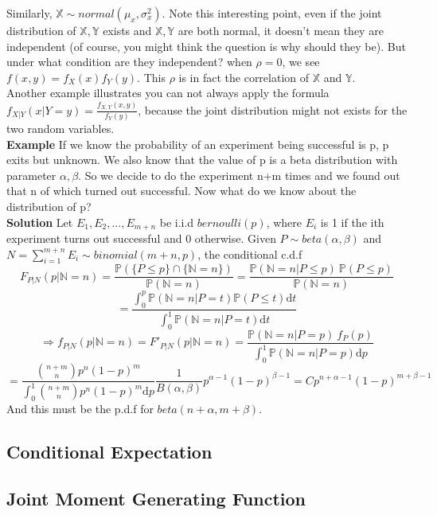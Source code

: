 \documentclass[a4paper,12pt]{article}
\begin{document}
Similarly, $\mathbb{X} \sim  normal( \mu_x, \sigma^2_x)$. Note this interesting point, even if the joint distribution of $\mathbb{X}, \mathbb{Y}$ exists and $\mathbb{X}, \mathbb{Y}$ are both normal, it doesn't mean they are independent (of course, you might think the question is why should they be). But under what condition are they independent? when $\rho = 0$, we see $f(x, y) = f_X(x)f_Y(y)$. This $\rho$ is in fact the correlation of $\mathbb{X}$ and $\mathbb{Y}$.\\

Another example illustrates you can not always apply the formula $f_{X|Y}(x|Y=y) = \frac{f_{X,Y}(x, y)}{f_Y(y)}$, because the joint distribution might not exists for the two random variables.\\

\textbf{Example} If we know the probability of an experiment being successful is p, p exits but unknown. We also know that the value of p is a beta distribution with parameter $\alpha, \beta$. So we decide to do the experiment n+m times and we found out that n of which turned out successful. Now what do we know about the distribution of p?\\

\textbf{Solution}
Let $E_1, E_2, ..., E_{m+n}$ be i.i.d $bernoulli(p)$, where $E_i$ is 1 if the ith experiment turns out successful and 0 otherwise. Given $P \sim beta(\alpha, \beta)$ and $N = \sum_{i=1}^{m+n} E_i \sim binomial(m+n, p)$, the conditional c.d.f 
$$F_{P|N}(p|\mathbb{N}=n) = \frac{\mathbb{P}( \{P \leq p\} \cap \{\mathbb{N} = n\} )}{\mathbb{P}(\mathbb{N} = n)} = \frac{\mathbb{P}( \mathbb{N} = n | P \leq p )\  \mathbb{P}( P \leq p )}{\mathbb{P}(\mathbb{N} = n)} $$
$$= \frac{\int_0^p \mathbb{P} (\mathbb{N} = n | P=t) \mathbb{P}( P \leq t ) \mathrm{d}t }{\int_0^1 \mathbb{P} (\mathbb{N} = n | P=t) \mathrm{d}t }$$
$$\Rightarrow f_{P|N}(p|\mathbb{N}=n) = F'_{P|N}(p|\mathbb{N}=n) =   \frac{\mathbb{P} (\mathbb{N} = n | P=p)\ f_P(p)}{\int_0^1 \mathbb{P} (\mathbb{N} = n | P=p) \mathrm{d}p }$$
$$= \frac{ {n+m \choose n}p^n(1-p)^m }{\int_0^1{ n+m \choose n}p^n(1-p)^m\mathrm{d}p}\frac{1}{B(\alpha,	\beta)} p^{\alpha-1} (1-p)^{\beta-1} = C p^{n+\alpha-1} (1-p)^{m+\beta-1}$$
And this must be the p.d.f for $beta(n+\alpha, m+\beta )$.

\subsection{Conditional Expectation}

\subsection{Joint Moment Generating Function}
\end{document}
